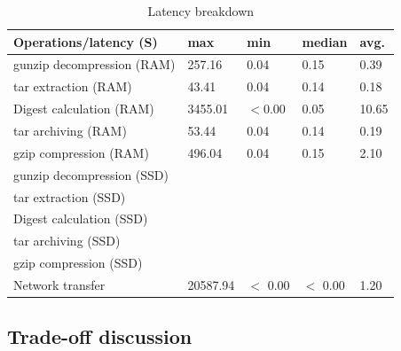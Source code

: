 
\begin{table} 
	\centering 
	\scriptsize  
	\caption{Latency breakdown} \label{tbl:latency_breakdown} 
	\begin{tabular}{|l|l|l|l|l|}%
		\hline 
		Operations/latency (S) & max & min & median & avg.\\
		\hline
		 gunzip decompression (RAM) & 257.16  & 0.04  & 0.15  & 0.39 \\
 		\hline
 		tar extraction (RAM) & 43.41  & 0.04  &  0.14  & 0.18 \\
		\hline
		Digest calculation (RAM) & 3455.01  & $<$0.00  & 0.05 & 10.65 \\
		\hline
		tar archiving (RAM)  & 53.44 & 0.04 & 0.14 & 0.19\\
		\hline
		gzip compression (RAM) & 496.04 & 0.04 & 0.15 & 2.10 \\
		\hline
 		\hline
 		gunzip decompression (SSD) &   &   &    &  \\
 		\hline
 		tar extraction (SSD) &   &   &    &  \\
		\hline
		Digest calculation (SSD) &  &  & & \\
		\hline
		tar archiving (SSD) &  &  & & \\
		\hline
		gzip compression (SSD) & &  &  & \\
		\hline
		\hline
		Network transfer & 20587.94 & $<$ 0.00 & $<$ 0.00 & 1.20 \\
		\hline 	
	\end{tabular} 
\end{table}

\subsection{Trade-off discussion}

